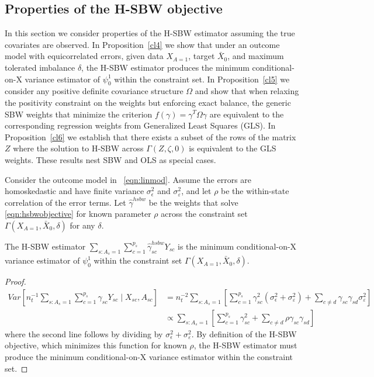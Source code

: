 \subsection{Properties of the H-SBW objective}\label{app:AsecII}
    In this section we consider properties of the H-SBW estimator assuming the true covariates are observed. In Proposition~\ref{cl4} we show that under an outcome model with equicorrelated errors, given data $X_{A=1}$, target $\bar{X}_0$, and maximum tolerated imbalance $\delta$, the H-SBW estimator produces the minimum conditional-on-X variance estimator of $\psi_0^1$ within the constraint set. In Proposition~\ref{cl5} we consider any positive definite covariance structure $\Omega$ and show that when relaxing the positivity constraint on the weights but enforcing exact balance, the generic SBW weights that minimize the criterion $f(\gamma) = \gamma^T\Omega\gamma$ are equivalent to the corresponding regression weights from Generalized Least Squares (GLS). In Proposition~\ref{cl6} we establish that there exists a subset of the rows of the matrix $Z$ where the solution to H-SBW across $\Gamma(Z, \zeta, 0)$ is equivalent to the GLS weights. These results nest SBW and OLS as special cases.

\begin{proposition}\label{cl4}
    Consider the outcome model in ~\eqref{eqn:linmod}. Assume the errors are homoskedastic and have finite variance $\sigma^2_{\epsilon}$ and $\sigma^2_{\varepsilon}$, and let $\rho$ be the within-state correlation of the error terms. Let $\hat{\gamma}^{hsbw}$ be the weights that solve \eqref{eqn:hsbwobjective} for known parameter $\rho$ across the constraint set $\Gamma(X_{A=1}, \bar{X}_0, \delta)$ for any $\delta$. 
    
    The H-SBW estimator $\sum_{s: A_s = 1}\sum_{c=1}^{p_s}\hat{\gamma}_{sc}^{hsbw}Y_{sc}$ is the minimum conditional-on-X variance estimator of $\psi_0^1$ within the constraint set $\Gamma(X_{A=1}, \bar{X}_0, \delta)$.
\end{proposition}

\begin{proof}
\begin{align*}
    Var[n_t^{-1}\sum_{s: A_s = 1}\sum_{c = 1}^{p_s}\gamma_{sc}Y_{sc} \mid X_{sc}, A_{sc}] &= n_t^{-2}\sum_{s: A_s = 1}[\sum_{c = 1}^{p_s}\gamma_{sc}^2(\sigma^2_{\epsilon} + \sigma^2_{\varepsilon}) + \sum_{c \ne d}\gamma_{sc}\gamma_{sd}\sigma^2_{\varepsilon}] \\
    &\propto \sum_{s: A_s = 1}[\sum_{c = 1}^{p_s}\gamma_{sc}^2 + \sum_{c \ne d}\rho \gamma_{sc}\gamma_{sd}]
\end{align*}
%
where the second line follows by dividing by $\sigma^2_{\epsilon} + \sigma^2_{\varepsilon}$. By definition of the H-SBW objective, which minimizes this function for known $\rho$, the H-SBW estimator must produce the minimum conditional-on-X variance estimator within the constraint set.
\end{proof}

